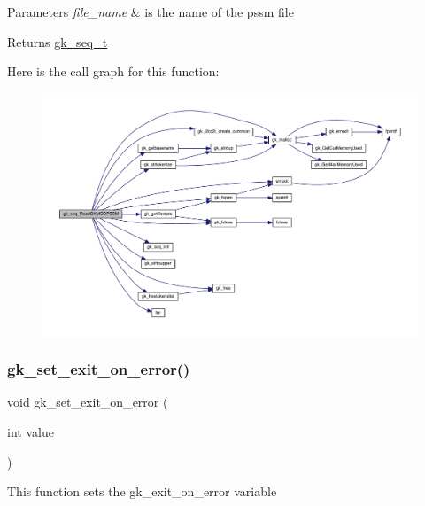 \begin{DoxyParams}{Parameters}
{\em file\+\_\+name} & is the name of the pssm file \\
\hline
\end{DoxyParams}
\begin{DoxyReturn}{Returns}
\hyperlink{a00674}{gk\+\_\+seq\+\_\+t} 
\end{DoxyReturn}
Here is the call graph for this function\+:\nopagebreak
\begin{figure}[H]
\begin{center}
\leavevmode
\includegraphics[width=350pt]{a00077_a3cafd54880b0693e95789c512c6f22d3_cgraph}
\end{center}
\end{figure}
\mbox{\label{a00077_ac8478262a791bb8b09708996ad1a548e}} 
\subsubsection{\texorpdfstring{gk\+\_\+set\+\_\+exit\+\_\+on\+\_\+error()}{gk\_set\_exit\_on\_error()}}
{\footnotesize\ttfamily void gk\+\_\+set\+\_\+exit\+\_\+on\+\_\+error (\begin{DoxyParamCaption}\item[{int}]{value }\end{DoxyParamCaption})}

This function sets the gk\+\_\+exit\+\_\+on\+\_\+error variable \mbox{\label{a00077_a6eadb77c33b5cf46e2faa0a1f7923f50}} 
